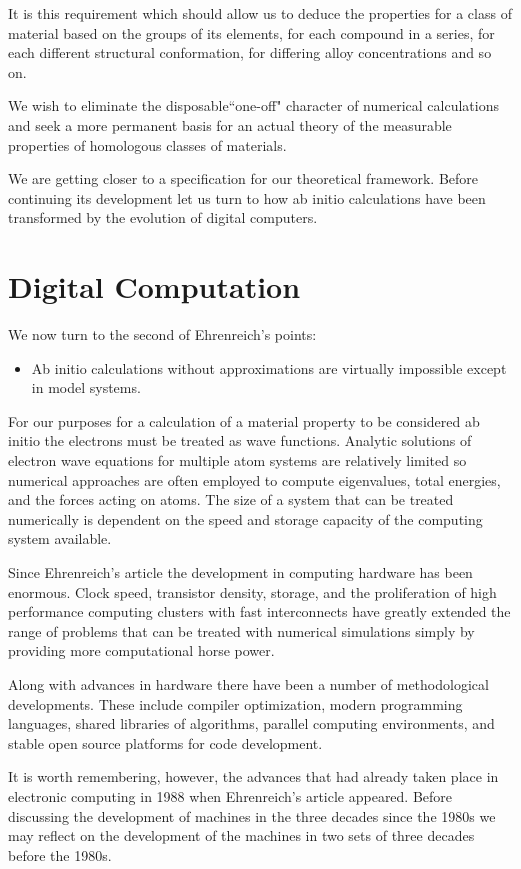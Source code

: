 It is this requirement which should allow us to deduce the properties
for a class of material based on the groups of its elements, 
for each compound in a series, for each different structural conformation,
for differing alloy concentrations and so on. 

We wish to eliminate the disposable``one-off" character of 
numerical calculations and seek a more permanent basis for an actual 
theory of the measurable properties of homologous classes of materials.

We are getting closer to a specification for our theoretical framework. 
Before continuing its development let us turn to how ab initio calculations have been 
transformed by the evolution of digital computers. 

\section{Digital Computation}
\label{sec:riseofcomp}
We now turn to the second of Ehrenreich's points:
%
\begin{itemize}
\item Ab initio calculations without approximations are virtually impossible 
      except in model systems.
\end{itemize}
%
For our purposes for a calculation of a material property to be considered ab initio 
the electrons must be treated as wave functions. Analytic solutions of electron wave equations
for multiple atom systems are relatively limited so numerical approaches are often employed 
to compute eigenvalues, total energies, and the forces acting on atoms. The size of a system
that can be treated numerically is dependent on the speed and storage capacity of the 
computing system available.

Since Ehrenreich's article the development in computing hardware has been enormous. 
Clock speed, transistor density, storage, and the proliferation of high 
performance computing clusters with fast interconnects have greatly extended 
the range of problems that can be treated with numerical simulations
simply by providing more computational horse power.

Along with advances in hardware there have been a number
of methodological developments. These include compiler 
optimization, modern programming languages, 
shared libraries of algorithms, parallel computing environments, and 
stable open source platforms for code development.

It is worth remembering, however, the advances that had already 
taken place in electronic computing in 1988 when Ehrenreich's article appeared.
Before discussing the development of machines in the three decades since the 1980s 
we may reflect on the development of the machines in two
sets of three decades before the 1980s. 

